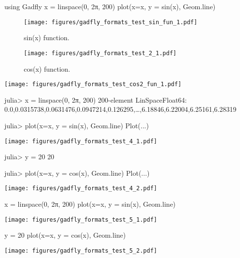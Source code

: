 \begin{juliacode}
using Gadfly
x = linspace(0, 2π, 200)
plot(x=x, y = sin(x), Geom.line)
\end{juliacode}
\begin{figure}[ht]
\center
\texttt{[image: figures/gadfly\_formats\_test\_sin\_fun\_1.pdf]}
\caption{sin(x) function.}
\label{fig:sin_fun}
\end{figure}

\begin{figure}[htpb]
\center
\texttt{[image: figures/gadfly\_formats\_test\_2\_1.pdf]}
\caption{cos(x) function.}
\end{figure}

\texttt{[image: figures/gadfly\_formats\_test\_cos2\_fun\_1.pdf]}

\begin{juliaterm}
julia> x = linspace(0, 2π, 200)
200-element LinSpace{Float64}:
 0.0,0.0315738,0.0631476,0.0947214,0.126295,…,6.18846,6.22004,6.25161,6.28319

julia> plot(x=x, y = sin(x), Geom.line)
Plot(...)

\end{juliaterm}
\texttt{[image: figures/gadfly\_formats\_test\_4\_1.pdf]}

\begin{juliaterm}
julia> y = 20
20

julia> plot(x=x, y = cos(x), Geom.line)
Plot(...)

\end{juliaterm}
\texttt{[image: figures/gadfly\_formats\_test\_4\_2.pdf]}

\begin{juliacode}
x = linspace(0, 2π, 200)
plot(x=x, y = sin(x), Geom.line)
\end{juliacode}
\texttt{[image: figures/gadfly\_formats\_test\_5\_1.pdf]}

\begin{juliacode}
y = 20
plot(x=x, y = cos(x), Geom.line)
\end{juliacode}
\texttt{[image: figures/gadfly\_formats\_test\_5\_2.pdf]}
